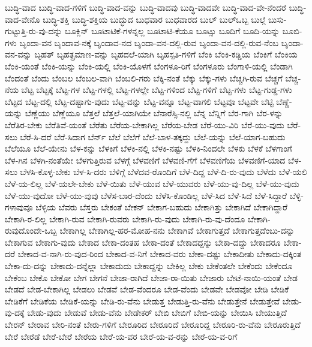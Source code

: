 {ಬುದ್ಧಿ-ವಾದ
ಬುದ್ಧಿ-ವಾದ-ಗಳಿಗೆ
ಬುದ್ಧಿ-ವಾದ-ವನ್ನು
ಬುದ್ಧಿ-ವಾದವು
ಬುದ್ಧಿ-ವಾದವೇ
ಬುದ್ಧಿ-ವಾದ-ವೇ-ನೆಂದರೆ
ಬುದ್ಧಿ-ವಾದ-ವೇನೊ
ಬುದ್ಧಿ-ಶಕ್ತಿ
ಬುದ್ಧಿ-ಶಕ್ತಿಯ
ಬುದ್ಭುದ
ಬುಧವಾರ
ಬುಧವಾರದ
ಬುಲ್
ಬುಲ್ಒಬ್ಬ
ಬುಲ್ಗೆ
ಬುಸು-ಗುಟ್ಟುತ್ತಿ-ರು-ವು-ದನ್ನು
ಬೂಕ್ಲಿನ್
ಬೂಟಾಟಿಕೆ-ಗಳನ್ನಲ್ಲ
ಬೂಟಾಟಿ-ಕೆಯೂ
ಬೂಟ್ಸು
ಬೂದಿಗೆ
ಬೂದಿ-ಯನ್ನು
ಬೂಬಿ-ಗಳು
ಬೃಂದಾ-ವನ
ಬೃಂದಾವ-ನಕ್ಕೆ
ಬೃಂದಾವ-ನದ
ಬೃಂದಾ-ವನ-ದಲ್ಲಿ-ರುವ
ಬೃಂದಾ-ವನ-ದಲ್ಲಿ-ರುವ-ನೆಂಬ
ಬೃಂದಾ-ವನ-ವನ್ನು
ಬೃಹತ್
ಬೃಹತ್ಪ್ರಮಾಣ-ವನ್ನು
ಬೃಹದಲೆ-ಯಾಗಿ
ಬೃಹಸ್ಪತಿ-ಗಳಿಗೆ
ಬೆಂಕಿ
ಬೆಂಕಿ-ಕಡ್ಡಿಯ
ಬೆಂಕಿಗೆ
ಬೆಂಕಿಯ
ಬೆಂಕಿ-ಯಂತೆ
ಬೆಂಕಿ-ಯನ್ನು
ಬೆಂಕಿ-ಯಲ್ಲಿ
ಬೆಂಕಿ-ಯೊಳಗೆ
ಬೆಂಗಳೂ-ರಿಗೆ
ಬೆಂಗಳೂರು
ಬೆಂಗಾಳಿ-ಯಲ್ಲಿ
ಬೆಂಡಾಗಿ
ಬೆಂದಂತೆ
ಬೆಂದು
ಬೆಂಬಲ
ಬೆಂಬಲ-ವಾಗಿ
ಬೆಂಬಲಿ-ಗರು
ಬೆಕ್ಕಿ-ನಂತೆ
ಬೆಕ್ಕು
ಬೆಕ್ಕು-ಗಳು
ಬೆಚ್ಚಗಿ-ರುವ
ಬೆಚ್ಚಗೆ
ಬೆಚ್ಚ-ನೆಯ
ಬೆಟ್ಟ
ಬೆಟ್ಟಕ್ಕೆ
ಬೆಟ್ಟ-ಗಳ
ಬೆಟ್ಟ-ಗಳಲ್ಲಿ
ಬೆಟ್ಟ-ಗಳಲ್ಲೇ
ಬೆಟ್ಟ-ಗಳಿಂದ
ಬೆಟ್ಟ-ಗಳಿಗೆ
ಬೆಟ್ಟ-ಗಳು
ಬೆಟ್ಟ-ಗುಡ್ಡ-ಗಳು
ಬೆಟ್ಟದ
ಬೆಟ್ಟ-ದಲ್ಲಿ
ಬೆಟ್ಟ-ದಷ್ಟಾಗು-ವುದು
ಬೆಟ್ಟ-ವನ್ನು
ಬೆಟ್ಟ-ವನ್ನೂ
ಬೆಟ್ಟ-ವಾಗಲಿ
ಬೆಟ್ಟವೂ
ಬೆಟ್ಟವೇ
ಬೆಟ್ಟಿ
ಬೆಣ್ಣೆ-ಯನ್ನು
ಬೆಣ್ಣೆಯು
ಬೆಣ್ಣೆಯೂ
ಬೆತ್ತಲೆ
ಬೆತ್ತಲೆ-ಯಾಗಿಯೇ
ಬೆನಾರೆಸ್ಸಿ-ನಲ್ಲಿ
ಬೆನ್ನ
ಬೆನ್ನಿಗೆ
ಬೆರ-ಗಾಗಿ
ಬೆರ-ಳನ್ನು
ಬೆರೆತಿರ-ಬೇಕು
ಬೆರೆತಿವೆ-ಯಂತೆ
ಬೆರೆತು
ಬೆರೆಯ-ಬೇಕಾಗಿಲ್ಲ
ಬೆರೆಯ-ಬೇಡ
ಬೆರೆ-ಯು-ವಿರಿ
ಬೆರೆ-ಯು-ವುದು
ಬೆರೆ-ಸಲು
ಬೆರೆ-ಸಿ-ದರೆ
ಬೆರೆ-ಸಿದಾಗ
ಬೆರ್ನ್
ಬೆಲೆ
ಬೆಲೆಗೆ
ಬೆಲೆ-ಬಾಳ-ತಕ್ಕದ್ದು
ಬೆಲೆ-ಯನ್ನು
ಬೆಲೆ-ಯಾಗ-ಬಹುದು
ಬೆಲೆಯೂ
ಬೆಲೆ-ಯೇನು
ಬೆಳ-ಕನ್ನು
ಬೆಳಕಿಗೆ
ಬೆಳಕಿ-ನಲ್ಲಿ
ಬೆಳಕಿ-ನಷ್ಟು
ಬೆಳಕಿ-ನಿಂದಲೇ
ಬೆಳಕು
ಬೆಳಕೆ
ಬೆಳಗಾಂಗೆ
ಬೆಳ-ಗಿನ
ಬೆಳಗಿ-ನಂತೆಯೇ
ಬೆಳಗುತ್ತಿರುವ
ಬೆಳಗ್ಗೆ
ಬೆಳವಣಿಗೆ
ಬೆಳವಣಿ-ಗೆಗೆ
ಬೆಳವಣಿಗೆಯ
ಬೆಳವಣಿಗೆ-ಯಾದ
ಬೆಳ-ಸಲು
ಬೆಳಸಿ-ಕೊಳ್ಳ-ಬೇಕು
ಬೆಳ-ಸಿ-ದರು
ಬೆಳಿಗ್ಗೆ
ಬೆಳೆದವ-ರೊಂದಿಗೆ
ಬೆಳೆ-ದಿದ್ದ
ಬೆಳೆ-ದಿ-ರು-ವುದು
ಬೆಳೆದು
ಬೆಳೆ-ಯಲಿ
ಬೆಳೆ-ಯ-ಲಿಲ್ಲ
ಬೆಳೆ-ಯಲೇ-ಬೇಕು
ಬೆಳೆ-ಯಿತು
ಬೆಳೆ-ಯುವ
ಬೆಳೆ-ಯುವರು
ಬೆಳೆ-ಯು-ವು-ದಿಲ್ಲ
ಬೆಳೆ-ಯು-ವುದು
ಬೆಳೆ-ಯು-ವುದೋ
ಬೆಳೆ-ಯು-ವುವು
ಬೆಳೆಸ-ಬಾರ-ದೆಂದು
ಬೆಳೆಸಿ-ಕೊಂಡಿಲ್ಲ
ಬೆಳೆ-ಸಿದ
ಬೆಳೆ-ಸಿದೆ
ಬೆಳೆ-ಸಿದ್ದಾರೆ
ಬೆಳ್ಳಿ-ಗಳಾವುವೂ
ಬೆಳ್ಳಿಯ
ಬೆವರು
ಬೆಸ್ತರು
ಬೇಕಂತೆ
ಬೇಕನ್
ಬೇಕಾಗ-ಬಹುದು
ಬೇಕಾಗಿತ್ತು
ಬೇಕಾಗಿದೆ
ಬೇಕಾಗಿದ್ದಾರೆ
ಬೇಕಾಗಿ-ರ-ಲಿಲ್ಲ
ಬೇಕಾಗಿ-ರುವ
ಬೇಕಾಗಿ-ರುವರು
ಬೇಕಾಗಿ-ರು-ವುದು
ಬೇಕಾಗಿ-ರು-ವು-ದೆಂದೂ
ಬೇಕಾಗಿ-ರುವುದೊಂದೇ-ಒಬ್ಬ
ಬೇಕಾಗಿಲ್ಲ
ಬೇಕಾಗಿಲ್ಲ-ಹರ-ಮೋಹ-ನನು
ಬೇಕಾಗಿವೆ
ಬೇಕಾಗುತ್ತದೆ
ಬೇಕಾಗುತ್ತದೆಂಬು-ದನ್ನು
ಬೇಕಾಗುವ
ಬೇಕಾಗು-ವುದು
ಬೇಕಾದ
ಬೇಕಾ-ದಂತಹ
ಬೇಕಾ-ದಂತೆ
ಬೇಕಾದದ್ದನ್ನು
ಬೇಕಾ-ದದ್ದು
ಬೇಕಾದರೂ
ಬೇಕಾ-ದರೆ
ಬೇಕಾದ-ವ-ನಾಗಿ-ರು-ವುದ-ರಿಂದ
ಬೇಕಾದ-ವ-ನಿಗೆ
ಬೇಕಾದ-ವರು
ಬೇಕಾ-ದಷ್ಟು
ಬೇಕಾದೀತು
ಬೇಕಾದು-ದಕ್ಕಿಂತ
ಬೇಕಾ-ದು-ದನ್ನು
ಬೇಕಾದು-ದನ್ನೆಲ್ಲಾ
ಬೇಕಾದುದು
ಬೇಕಾದ್ದನ್ನು
ಬೇಕಿಲ್ಲ
ಬೇಕು
ಬೇಕೆಂತಲೇ
ಬೇಕೆಂದು
ಬೇಕೆಂದೂ
ಬೇಕೆಂಬ
ಬೇಕೊ
ಬೇಕೋ
ಬೇಗ
ಬೇಗನೆ
ಬೇಜಾ-ರಾಗಿದೆ
ಬೇಜಾ-ರಾ-ಯಿತು
ಬೇಜಾರು
ಬೇಟೆ-ನಾಯಿ-ಯಂತೆ
ಬೇಡ
ಬೇಡದೆ
ಬೇಡ-ಬೇಕಾಗಿಲ್ಲ
ಬೇಡಲು
ಬೇಡವೆ
ಬೇಡ-ವೆಂದರೂ
ಬೇಡ-ವೆಂದು
ಬೇಡವೇ
ಬೇಡವೋ
ಬೇಡಿ
ಬೇಡಿಕೆ
ಬೇಡಿಕೆಗೆ
ಬೇಡಿಕೆಯ
ಬೇಡಿಕೆ-ಯನ್ನು
ಬೇಡಿ-ರು-ವೆನು
ಬೇಡುತ್ತ
ಬೇಡುತ್ತಿ-ರು-ವೆನು
ಬೇಡುತ್ತೇನೆ
ಬೇಡುತ್ತೇವೆ
ಬೇಡು-ವು-ದಕ್ಕೆ
ಬೇಡು-ವುದು
ಬೇಡುವೆ
ಬೇಡು-ವೆನು
ಬೇಡೇಕರ್
ಬೇಬಿ
ಬೇಬಿಗೆ
ಬೇಬಿ-ಯನ್ನು
ಬೇಯಿಸಿ
ಬೇಯುತ್ತಿದೆ
ಬೇರನ್
ಬೇರಾವ
ಬೇರಿ-ನಂತೆ
ಬೇರು-ಗಳಿಗೆ
ಬೇರೂರಿದ
ಬೇರೂರಿದೆ
ಬೇರೂರಿದ್ದ
ಬೇರೂರಿ-ರು-ವೆನು
ಬೇರೂರುತ್ತಿದೆ
ಬೇರೆ
ಬೇರೆಡೆ
ಬೇರೆ-ಬೇರೆ
ಬೇರೆಯ
ಬೇರೆ-ಯ-ವರ
ಬೇರೆ-ಯ-ವ-ರನ್ನು
ಬೇರೆ-ಯ-ವ-ರಿಗೆ
}
